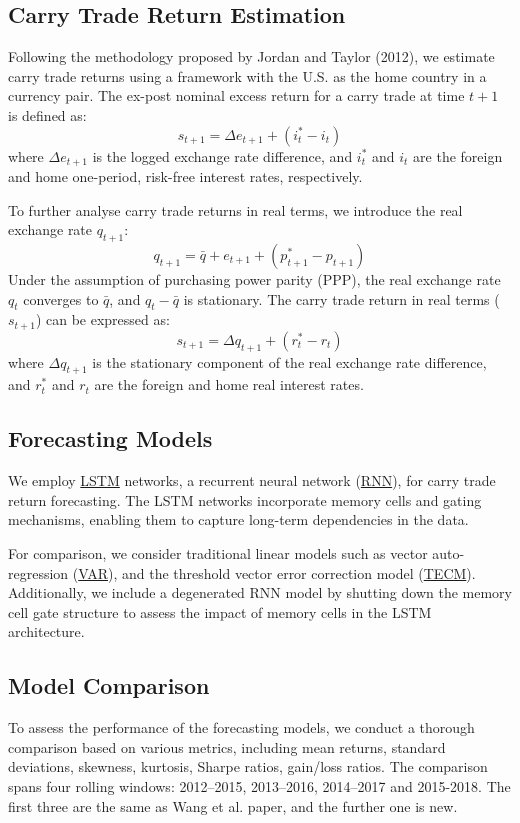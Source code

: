 \documentclass[a4paper,10pt]{article}
\begin{document}
\subsection{Carry Trade Return Estimation}

Following the methodology proposed by Jordan and Taylor (2012), we estimate carry trade returns using a framework with the U.S. as the home country in a currency pair. The ex-post nominal excess return for a carry trade at time \(t+1\) is defined as:
\[ s_{t+1} = \Delta e_{t+1} + (i^*_t - i_t) \]
where \(\Delta e_{t+1}\) is the logged exchange rate difference, and \(i^*_t\) and \(i_t\) are the foreign and home one-period, risk-free interest rates, respectively.

To further analyse carry trade returns in real terms, we introduce the real exchange rate \(q_{t+1}\):
\[ q_{t+1} = \bar{q} + e_{t+1} + (p^*_{t+1} - p_{t+1}) \]
Under the assumption of purchasing power parity (PPP), the real exchange rate \(q_t\) converges to \(\bar{q}\), and \(q_t - \bar{q}\) is stationary. The carry trade return in real terms (\(s_{t+1}\)) can be expressed as:
\[ s_{t+1} = \Delta q_{t+1} + (r^*_t - r_t) \]
where \(\Delta q_{t+1}\) is the stationary component of the real exchange rate difference, and \(r^*_t\) and \(r_t\) are the foreign and home real interest rates.

\subsection{Forecasting Models}

We employ \hyperref[appx:lstm]{LSTM} networks, a recurrent neural network (\hyperref[appx:rnn]{RNN}), for carry trade return forecasting. The LSTM networks incorporate memory cells and gating mechanisms, enabling them to capture long-term dependencies in the data.

For comparison, we consider traditional linear models such as vector auto-regression (\hyperref[appx:var]{VAR}), and the threshold vector error correction model (\hyperref[appx:tecm]{TECM}). Additionally, we include a degenerated RNN model by shutting down the memory cell gate structure to assess the impact of memory cells in the LSTM architecture.

\subsection{Model Comparison}

To assess the performance of the forecasting models, we conduct a thorough comparison based on various metrics, including mean returns, standard deviations, skewness, kurtosis, Sharpe ratios, gain/loss ratios. The comparison spans four rolling windows: 2012–2015, 2013–2016, 2014–2017 and 2015-2018. The first three are the same as Wang et al. paper, and the further one is new.
\end{document}
